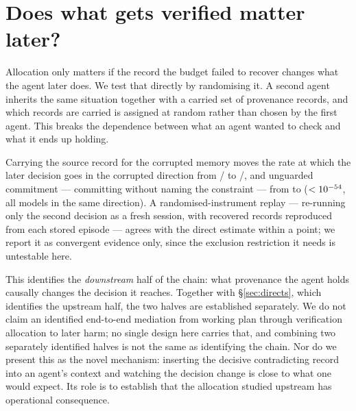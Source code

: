 \section{Does what gets verified matter later?}\label{sec:downstream}

Allocation only matters if the record the budget failed to recover changes what
the agent later does. We test that directly by randomising it. A second agent
inherits the same situation together with a carried set of provenance records,
and which records are carried is assigned at random rather than chosen by the
first agent. This breaks the dependence between what an agent wanted to check
and what it ends up holding.

Carrying the source record for the corrupted memory moves the rate at which the
later decision goes in the corrupted direction from \ThreeBOthK/\ThreeBOthN{}
to \ThreeBTgtK/\ThreeBTgtN{}, and unguarded commitment --- committing without
naming the constraint --- from \ThreeBNGOth{} to \ThreeBNGTgt{}
($<10^{-54}$, all \ThreeBAllModels{} models in the same direction). A randomised-instrument replay --- re-running only the second decision as a
fresh session, with recovered records reproduced from each stored episode ---
agrees with the direct estimate within a point; we report it as convergent
evidence only, since the exclusion restriction it needs is untestable here.

This identifies the \emph{downstream} half of the chain: what provenance the
agent holds causally changes the decision it reaches. Together with
\S\ref{sec:directs}, which identifies the upstream half, the two halves are
established separately. We do not claim an identified end-to-end mediation from
working plan through verification allocation to later harm; no single design
here carries that, and combining two separately identified halves is not the
same as identifying the chain. Nor do we present this as the novel mechanism:
inserting the decisive contradicting record into an agent's context and
watching the decision change is close to what one would expect. Its role is to
establish that the allocation studied upstream has operational consequence.
